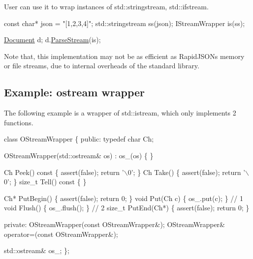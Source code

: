 User can use it to wrap instances of {\ttfamily std\+::stringstream}, {\ttfamily std\+::ifstream}.


\begin{DoxyCode}
\textcolor{keyword}{const} \textcolor{keywordtype}{char}* json = \textcolor{stringliteral}{"[1,2,3,4]"};
std::stringstream ss(json);
IStreamWrapper is(ss);

\hyperlink{class_generic_document}{Document} d;
d.\hyperlink{class_generic_document_afe94c0abc83a20f2d7dc1ba7677e6238}{ParseStream}(is);
\end{DoxyCode}


Note that, this implementation may not be as efficient as Rapid\+J\+S\+ON\textquotesingle{}s memory or file streams, due to internal overheads of the standard library.\hypertarget{md_Cadriciel_Commun_Externe_RapidJSON_doc_stream.zh-cn_ExampleOStreamWrapper}{}\subsection{Example\+: ostream wrapper}\label{md_Cadriciel_Commun_Externe_RapidJSON_doc_stream.zh-cn_ExampleOStreamWrapper}
The following example is a wrapper of {\ttfamily std\+::istream}, which only implements 2 functions.


\begin{DoxyCode}
\textcolor{keyword}{class }OStreamWrapper \{
\textcolor{keyword}{public}:
    \textcolor{keyword}{typedef} \textcolor{keywordtype}{char} Ch;

    OStreamWrapper(std::ostream& os) : os\_(os) \{
    \}

    Ch Peek()\textcolor{keyword}{ const }\{ assert(\textcolor{keyword}{false}); \textcolor{keywordflow}{return} \textcolor{charliteral}{'\(\backslash\)0'}; \}
    Ch Take() \{ assert(\textcolor{keyword}{false}); \textcolor{keywordflow}{return} \textcolor{charliteral}{'\(\backslash\)0'}; \}
    \textcolor{keywordtype}{size\_t} Tell()\textcolor{keyword}{ const }\{  \}

    Ch* PutBegin() \{ assert(\textcolor{keyword}{false}); \textcolor{keywordflow}{return} 0; \}
    \textcolor{keywordtype}{void} Put(Ch c) \{ os\_.put(c); \}                  \textcolor{comment}{// 1}
    \textcolor{keywordtype}{void} Flush() \{ os\_.flush(); \}                   \textcolor{comment}{// 2}
    \textcolor{keywordtype}{size\_t} PutEnd(Ch*) \{ assert(\textcolor{keyword}{false}); \textcolor{keywordflow}{return} 0; \}

\textcolor{keyword}{private}:
    OStreamWrapper(\textcolor{keyword}{const} OStreamWrapper&);
    OStreamWrapper& operator=(\textcolor{keyword}{const} OStreamWrapper&);

    std::ostream& os\_;
\};
\end{DoxyCode}


